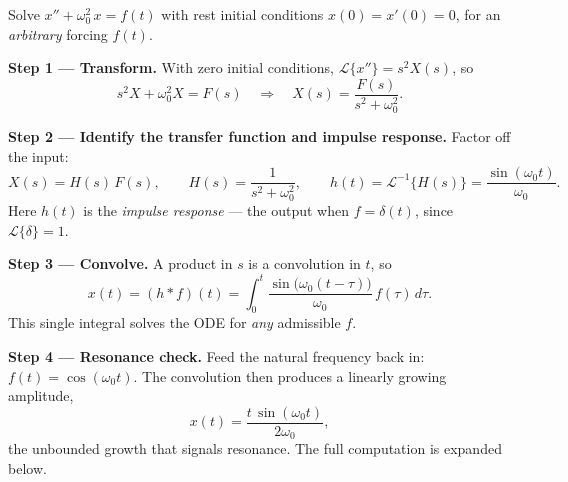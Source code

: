 \documentclass[11pt]{article}
\begin{document}
\begin{methodbox}
Solve $x'' + \omega_0^2\, x = f(t)$ with rest initial conditions $x(0) = x'(0) = 0$, for an \emph{arbitrary} forcing $f(t)$.

\smallskip
\textbf{Step 1 --- Transform.} With zero initial conditions, $\mathcal{L}\{x''\} = s^2 X(s)$, so
\[ s^2 X + \omega_0^2 X = F(s) \quad\Longrightarrow\quad X(s) = \frac{F(s)}{s^2 + \omega_0^2}. \]

\textbf{Step 2 --- Identify the transfer function and impulse response.} Factor off the input:
\[ X(s) = H(s)\,F(s), \qquad H(s) = \frac{1}{s^2 + \omega_0^2}, \qquad h(t) = \mathcal{L}^{-1}\{H(s)\} = \frac{\sin(\omega_0 t)}{\omega_0}. \]
Here $h(t)$ is the \emph{impulse response} --- the output when $f = \delta(t)$, since $\mathcal{L}\{\delta\} = 1$.

\textbf{Step 3 --- Convolve.} A product in $s$ is a convolution in $t$, so
\[ x(t) = (h * f)(t) = \int_0^t \frac{\sin\big(\omega_0(t-\tau)\big)}{\omega_0}\, f(\tau)\,d\tau. \]
This single integral solves the ODE for \emph{any} admissible $f$.

\textbf{Step 4 --- Resonance check.} Feed the natural frequency back in: $f(t) = \cos(\omega_0 t)$. The convolution then produces a linearly growing amplitude,
\[ x(t) = \frac{t\,\sin(\omega_0 t)}{2\omega_0}, \]
the unbounded growth that signals resonance. The full computation is expanded below.
\end{methodbox}
\end{document}
